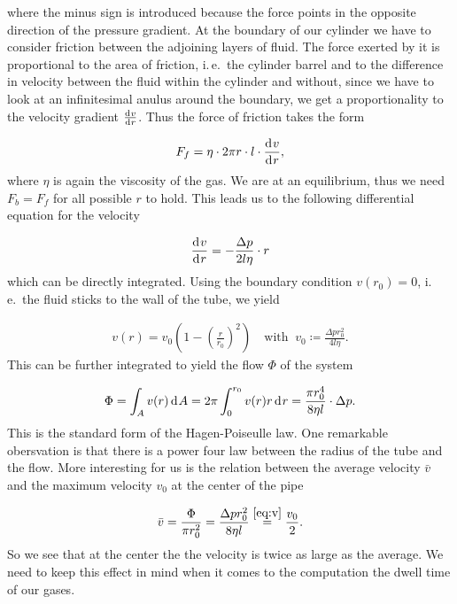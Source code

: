 where the minus sign is introduced because the force points in the
opposite direction of the pressure gradient. At the boundary of our
cylinder we have to consider friction between the adjoining layers of
fluid. The force exerted by it is proportional to the area of
friction, i.\,e.\ the cylinder barrel and to the difference in velocity
between the fluid within the cylinder and without, since we have to
look at an infinitesimal anulus around the boundary, we get a
proportionality to the velocity gradient $\frac{\d[v]}{\d[r]}$. Thus
the force of friction takes the form

\begin{align*}
  F_f = \eta \cdot 2\pi r \cdot l \cdot \frac{\d[v]}{\d[r]},
\end{align*}
where $\eta$ is again the viscosity of the gas.  We are at an
equilibrium, thus we need $F_b = F_f$ for all possible $r$ to
hold. This leads us to the following differential equation for the
velocity

\begin{align*}
  \frac{\d[v]}{\d[r]} = - \frac{\Delta p}{2l\eta} \cdot r
\end{align*}
which can be directly integrated. Using the boundary condition $v(r_0)
= 0$, i.\,e.\ the fluid sticks to the wall of the tube, we yield

\begin{align}
  v(r) = v_0 \left ( 1 - \left( \frac{r}{r_0} \right)^2 \right) \quad
  \text{with }\ v_0 \coloneqq \frac{\Delta p r_0^2}{4 l \eta}. \label{eq:v}
\end{align}
This can be further integrated to yield the flow $\Phi$ of the system

\begin{align*}
  \Phi = \int_A v(r) \d[A] = 2\pi \int_0^{r_0} v(r)r \d[r] = \frac{\pi
  r_0^4}{8\eta l} \cdot \Delta p.
\end{align*}
This is the standard form of the Hagen-Poiseulle law. One remarkable
obersvation is that there is a power four law between the radius of
the tube and the flow. More interesting for us is the relation between
the average velocity $\bar v$ and the maximum velocity $v_0$ at the
center of the pipe

\begin{align*}
  \bar v = \frac{\Phi}{\pi r_0^2} = \frac{\Delta p r_0^2}{8\eta l} \stackrel{\eqref{eq:v}}{=} \frac{v_0}{2}.
\end{align*}
So we see that at the center the the velocity is twice as large as the
average. We need to keep this effect in mind when it comes to the
computation the dwell time of our gases.


